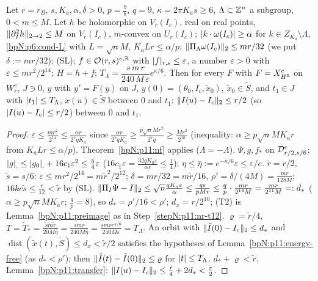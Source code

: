 \begin{proposition}\label{bpN:p11:resonant}
Let $r=r_B$, $s,K_a,\alpha,\delta>0$, $p=\frac98$, $q=9$, $\kappa=2\pi K_as\ge6$, $\Lambda\subset\mathbb{Z}^n$ a subgroup, $0<m\le M$. Let $h$ be holomorphic on $V_r(I_c)$, real on real points, $\lVert \partial_I^2h\rVert_{2\to2}\le M$ on $V_r(I_c)$, $m$-convex on $U_r(I_c)$; $\lvert k\cdot\omega(I_c)\rvert\ge\alpha$ for $k\in Z_{K_a}\setminus\Lambda$, \ref{bpN:p6:cond-L} with $L=\sqrt nM$, $K_aLr\le\alpha/p$; $\lVert \Pi_\Lambda\omega(I_c)\rVert_2\le mr/32$ (we put $\delta:=mr/32$); (SL); $f\in\mathcal O(r,s)^{e,\mathbb{R}}$ with $\lvert f\rvert_{r,s}\le\varepsilon$, a number $\varepsilon>0$ with $\varepsilon\le mr^2/2^{14}$; $H=h+f$; $T_\Lambda=\dfrac{s\,m\,r}{240\,M\,\varepsilon}e^{\kappa/6}$. Then for every $F$ with $F=X^c_{H^{\mathbb{R}}}$ on $W^e_r$, $J\ni0$, $y$ with $y'=F(y)$ on $J$, $y(0)=(\theta_0,I_c,\tilde x_0)$, $\tilde x_0\in\tilde S$, and $t_1\in J$ with $\lvert t_1\rvert\le T_\Lambda$, $\tilde x(u)\in\tilde S$ between $0$ and $t_1$: $\lVert I(u)-I_c\rVert_2\le r/2$ (so $\lvert I(u)-I_c\rvert\le r/2$) between $0$ and $t_1$.
\end{proposition}
\begin{proof}
\label{stepN:p11:rs-red} $\varepsilon\le\frac{mr^2}{2^{14}}\le\frac{\alpha r}{2^7qK_a}$ since $\frac{\alpha r}{2^7qK_a}\ge\frac{p\sqrt nMr^2}{2^7q}\ge\frac{Mr^2}{2^{10}}$ (inequality: $\alpha\ge p\sqrt nMK_ar$ from $K_aLr\le\alpha/p$). Theorem~\ref{bpN:p11:nf} applies ($\Lambda=-\Lambda$).
\label{stepN:p11:rs-nf} $\Psi,g,f_*$ on $\mathcal D_{r/2,s/6}^e$; $\lvert g\rvert_{,}\le\lvert g_0\rvert_{,}+16c_1\varepsilon^2\le\frac54\varepsilon$ ($16c_1\varepsilon=\frac{32qK_a\varepsilon}{\alpha r}\le\frac14$); $\eta\le\bar\eta:=e^{-\kappa/6}\varepsilon\le\varepsilon/e$. $\tilde r=r/2$, $\tilde s=s/6$: $\varepsilon\le m r^2/2^{14}=m\tilde r^2/2^{12}$; $\delta=mr/32=m\tilde r/16$, $\rho'=\delta/(4M)=\frac{mr}{128M}$; $16kc\tilde s\le\frac r{12}<\tilde r$ by (SL).
\label{stepN:p11:rs-t12} $\lVert \Pi_I\Psi-I\rVert_2\le\sqrt n\frac{qK_a\varepsilon}\alpha\le\frac{q\varepsilon}{pMr}\le\frac{q}{p}\cdot\frac{mr}{2^{14}M}=\frac{mr}{2^{11}M}=:d_*$ ($\alpha\ge p\sqrt nMK_ar$; $\frac qp=8$), so $d_*=\rho'/16<\rho'$; $d_x=r/2^{10}$; (T2) is Lemma~\ref{bpN:p11:preimage} as in Step~\ref{stepN:p11:nr-t12}.
\label{stepN:p11:rs-t3} $\varrho=\tilde r/4$, $T=\tilde T_*=\frac{\tilde sm\tilde r}{20M\bar\eta}=\frac{smr}{240M\bar\eta}=\frac{smre^{\kappa/6}}{240M\varepsilon}=T_\Lambda$. An orbit with $\lVert \tilde I(0)-I_c\rVert_2\le d_*$ and $\operatorname{dist}(\tilde x(t),\tilde S)\le d_x<\tilde r/2$ satisfies the hypotheses of Lemma~\ref{bpN:p11:energy-free} (as $d_*<\rho'$); then $\lVert \tilde I(t)-\tilde I(0)\rVert_2\le\varrho$ for $\lvert t\rvert\le T_\Lambda$. $d_*+\varrho<\tilde r$.
\label{stepN:p11:rs-concl} Lemma~\ref{bpN:p11:transfer}: $\lVert I(u)-I_c\rVert_2\le\frac{\tilde r}4+2d_*<\frac r2$.
\end{proof}

